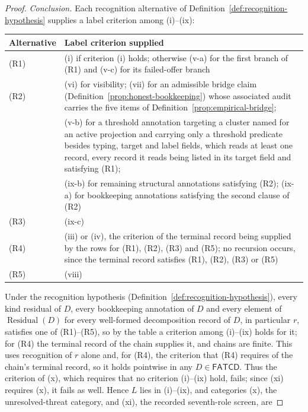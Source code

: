 \documentclass[11pt]{article}
\theoremstyle{definition}
\newcommand{\FATCD}{\ensuremath{\mathsf{FATCD}}}
\newcommand{\Residual}[1]{\ensuremath{\operatorname{Residual}\!\left(#1\right)}}
\begin{document}
\begin{proof}
\emph{Conclusion.} Each recognition alternative of
Definition~\ref{def:recognition-hypothesis} supplies a label criterion among
(i)--(ix):
\begin{center}
\small
\begin{tabularx}{\linewidth}{@{}l>{\raggedright\arraybackslash}X@{}}
\toprule
Alternative & Label criterion supplied \\
\midrule
(R1) & (i) if criterion (i) holds; otherwise (v-a) for the first branch of (R1) and (v-c) for its failed-offer branch \\
(R2) & (vi) for visibility; (vii) for an admissible bridge claim (Definition~\ref{prop:honest-bookkeeping}) whose associated audit carries the five items of Definition~\ref{prop:empirical-bridge}; \\
     & (v-b) for a threshold annotation targeting a cluster named for an active projection and carrying only a threshold predicate besides typing, target and label fields, which reads at least one record, every record it reads being listed in its target field and satisfying (R1); \\
     & (ix-b) for remaining structural annotations satisfying (R2); (ix-a) for bookkeeping annotations satisfying the second clause of (R2) \\
(R3) & (ix-c) \\
(R4) & (iii) or (iv), the criterion of the terminal record being supplied by the rows for (R1), (R2), (R3) and (R5); no recursion occurs, since the terminal record satisfies (R1), (R2), (R3) or (R5) \\
(R5) & (viii) \\
\bottomrule
\end{tabularx}
\end{center}
Under the recognition hypothesis
(Definition~\ref{def:recognition-hypothesis}), every kind residual of \(D\), every bookkeeping annotation of \(D\) and every element of \(\Residual{D}\) for every well-formed decomposition record of \(D\), in particular \(r\), satisfies one of (R1)--(R5), so by the table a criterion among (i)--(ix)
holds for it; for (R4) the terminal record of the chain supplies it, and
chains are finite. This uses recognition of \(r\) alone and, for (R4), the
criterion that (R4) requires of the chain's terminal record, so it holds
pointwise in any \(D\in\FATCD{}\). Thus the criterion of (x), which requires that no
criterion (i)--(ix) hold, fails; since (xi) requires (x), it fails as well.
Hence \(L\) lies in (i)--(ix), and categories (x), the
unresolved-threat category, and (xi), the recorded seventh-role screen, are

\end{proof}
\end{document}
